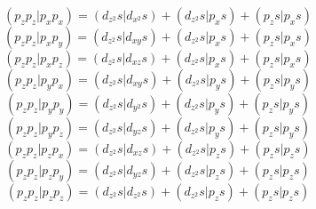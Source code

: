 \documentclass{article}
\begin{document}
\[  ( p_ { z } p_ { z } | p_ { x } p_ { x } ) = ( d_ { z^2 } s | d_ { x^2 } s ) + ( d_ { z^2 } s | p_ { x } s ) + ( p_ { z } s | p_ { x } s )  \]
\[  ( p_ { z } p_ { z } | p_ { x } p_ { y } ) = ( d_ { z^2 } s | d_ { x y } s ) + ( d_ { z^2 } s | p_ { x } s ) + ( p_ { z } s | p_ { x } s )  \]
\[  ( p_ { z } p_ { z } | p_ { x } p_ { z } ) = ( d_ { z^2 } s | d_ { x z } s ) + ( d_ { z^2 } s | p_ { x } s ) + ( p_ { z } s | p_ { x } s )  \]
\[  ( p_ { z } p_ { z } | p_ { y } p_ { x } ) = ( d_ { z^2 } s | d_ { x y } s ) + ( d_ { z^2 } s | p_ { y } s ) + ( p_ { z } s | p_ { y } s )  \]
\[  ( p_ { z } p_ { z } | p_ { y } p_ { y } ) = ( d_ { z^2 } s | d_ { y^2 } s ) + ( d_ { z^2 } s | p_ { y } s ) + ( p_ { z } s | p_ { y } s )  \]
\[  ( p_ { z } p_ { z } | p_ { y } p_ { z } ) = ( d_ { z^2 } s | d_ { y z } s ) + ( d_ { z^2 } s | p_ { y } s ) + ( p_ { z } s | p_ { y } s )  \]
\[  ( p_ { z } p_ { z } | p_ { z } p_ { x } ) = ( d_ { z^2 } s | d_ { x z } s ) + ( d_ { z^2 } s | p_ { z } s ) + ( p_ { z } s | p_ { z } s )  \]
\[  ( p_ { z } p_ { z } | p_ { z } p_ { y } ) = ( d_ { z^2 } s | d_ { y z } s ) + ( d_ { z^2 } s | p_ { z } s ) + ( p_ { z } s | p_ { z } s )  \]
\[  ( p_ { z } p_ { z } | p_ { z } p_ { z } ) = ( d_ { z^2 } s | d_ { z^2 } s ) + ( d_ { z^2 } s | p_ { z } s ) + ( p_ { z } s | p_ { z } s )  \]
\end{document}
